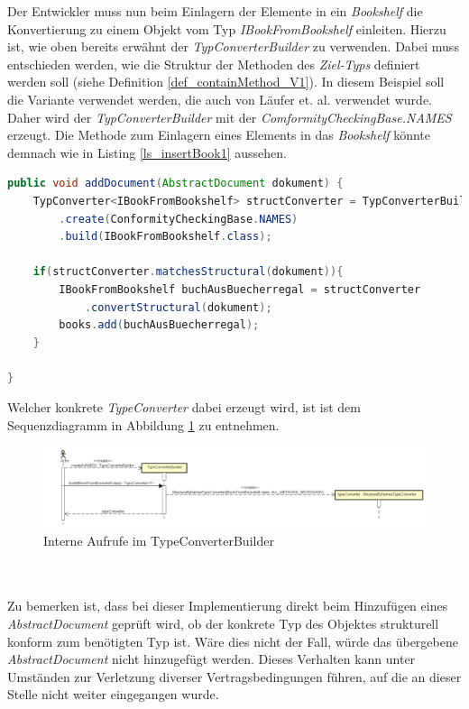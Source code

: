 \documentclass[11pt, 
ngerman,
doublespacing,
chapterinoneline, %
consistentlayout, %
]{scrartcl}
\begin{document}
Der Entwickler muss nun beim Einlagern der Elemente in ein \emph{Bookshelf} die Konvertierung zu einem Objekt vom Typ \emph{IBookFromBookshelf} einleiten. Hierzu ist, wie oben bereits erwähnt der \emph{TypConverterBuilder} zu verwenden. Dabei muss entschieden werden, wie die Struktur der Methoden des \emph{Ziel-Typs} definiert werden soll (siehe Definition \ref{def_containMethod_V1}). In diesem Beispiel soll die Variante verwendet werden, die auch von Läufer et. al. \cite{structconfjava} verwendet wurde. Daher wird der \emph{TypConverterBuilder} mit der \emph{ComformityCheckingBase.NAMES} erzeugt. Die Methode zum Einlagern eines Elements in das \emph{Bookshelf} könnte demnach wie in Listing \ref{ls_insertBook1} aussehen.
\begin{lstlisting}[language=Java, label=ls_insertBook1, caption=addDocument]
public void addDocument(AbstractDocument dokument) {
	TypConverter<IBookFromBookshelf> structConverter = TypConverterBuilder
		.create(ConformityCheckingBase.NAMES)
		.build(IBookFromBookshelf.class);

	if(structConverter.matchesStructural(dokument)){
		IBookFromBookshelf buchAusBuecherregal = structConverter
			.convertStructural(dokument);
		books.add(buchAusBuecherregal);
	}	
	
}
\end{lstlisting}
Welcher konkrete \emph{TypeConverter} dabei erzeugt wird, ist ist dem Sequenzdiagramm in Abbildung \ref{sd_typeconverterbuilder} zu entnehmen.
\begin{figure}[h]
\centering
\includegraphics[scale=0.25]{pics/sd_createSignatureTypeConverter.png}
\caption{Interne Aufrufe im TypeConverterBuilder}
\label{sd_typeconverterbuilder}
\end{figure}\\\\
Zu bemerken ist, dass bei dieser Implementierung direkt beim Hinzufügen eines \emph{AbstractDocument} geprüft wird, ob der konkrete Typ des Objektes strukturell konform zum benötigten Typ ist. Wäre dies nicht der Fall, würde das übergebene \emph{AbstractDocument} nicht hinzugefügt werden. Dieses Verhalten kann unter Umständen zur Verletzung diverser Vertragsbedingungen führen, auf die an dieser Stelle nicht weiter eingegangen wurde.\\\\
\end{document}
